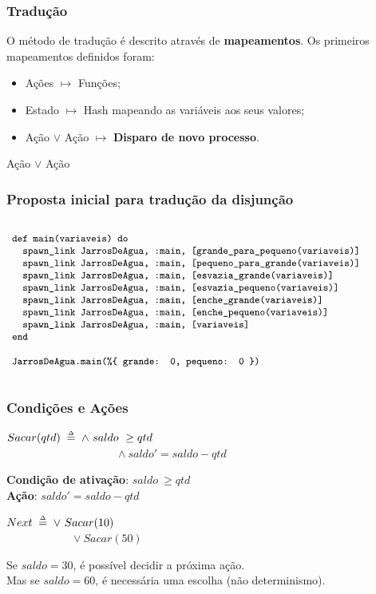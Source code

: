 \documentclass{beamer}
\begin{document}
\begin{frame}
  \frametitle{Tradução}
  O método de tradução é descrito através de \textbf{mapeamentos}. Os primeiros mapeamentos definidos foram:
  \begin{itemize}
    \item Ações $\mapsto$ Funções;
    \item Estado $\mapsto$ Hash mapeando as variáveis aos seus valores;
    \item Ação $\lor$ Ação $\mapsto$ \textbf{Disparo de novo processo}.
  \end{itemize}

  \begin{center}
    \Large{Ação $\lor$ Ação}
  \end{center}

\end{frame}

\begin{frame}
  \frametitle{Proposta inicial para tradução da disjunção}
  \hspace{-7mm}
  $\progfig{
  ~def main(variaveis) do\\
  ~~~spawn\_link JarrosDeAgua, :main, [grande\_para\_pequeno(variaveis)]\\
  ~~~spawn\_link JarrosDeAgua, :main, [pequeno\_para\_grande(variaveis)]\\
  ~~~spawn\_link JarrosDeAgua, :main, [esvazia\_grande(variaveis)]\\
  ~~~spawn\_link JarrosDeAgua, :main, [esvazia\_pequeno(variaveis)]\\
  ~~~spawn\_link JarrosDeAgua, :main, [enche\_grande(variaveis)]\\
  ~~~spawn\_link JarrosDeAgua, :main, [enche\_pequeno(variaveis)]\\
  ~~~spawn\_link JarrosDeAgua, :main, [variaveis]\\
  ~end\\\\
  ~JarrosDeAgua.main(\%\{\ grande: 0, pequeno: 0 \})
  }$
\end{frame}

\begin{frame}
  \frametitle{Condições e Ações}
  $Sacar(qtd) \;\mathrel{\smash {{\stackrel{\scriptscriptstyle\Delta}{=}}}}\; \land\ saldo\ \geq qtd$\\
  ~~~~~~~~~~~~~~~~~~~~$\land\ saldo' = saldo - qtd$\\\bigskip
  
  \textbf{Condição de ativação}: $saldo\ \geq qtd$\\
  \textbf{Ação}: $saldo' = saldo - qtd$\\\bigskip\pause
  
  $Next \;\mathrel{\smash {{\stackrel{\scriptscriptstyle\Delta}{=}}}}\; \lor\ Sacar(10)$\\
  ~~~~~~~~~~~~$\lor\ Sacar(50)$\\\bigskip
  
  Se $saldo = 30$, é possível decidir a próxima ação.\\
  Mas se $saldo = 60$, é necessária uma escolha (não determinismo).\\
\end{frame}
\end{document}
